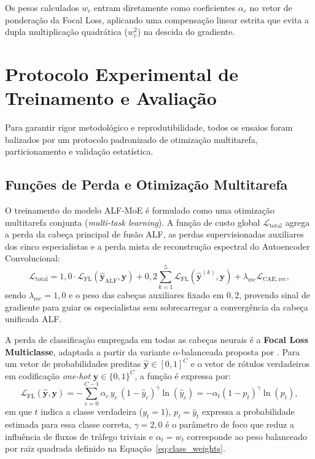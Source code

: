 Os pesos calculados $w_c$ entram diretamente como coeficientes $\alpha_c$ no vetor de ponderação da Focal Loss, aplicando uma compensação linear estrita que evita a dupla multiplicação quadrática ($w_c^2$) na descida do gradiente.


\section{Protocolo Experimental de Treinamento e Avaliação}
\label{sec:protocolo_experimental}

Para garantir rigor metodológico e reprodutibilidade, todos os ensaios foram balizados por um protocolo padronizado de otimização multitarefa, particionamento e validação estatística.

\subsection{Funções de Perda e Otimização Multitarefa}
\label{subsec:funcoes_perda}

O treinamento do modelo ALF-MoE é formulado como uma otimização multitarefa conjunta (\emph{multi-task learning}). A função de custo global $\mathcal{L}_{\mathrm{total}}$ agrega a perda da cabeça principal de fusão ALF, as perdas supervisionadas auxiliares dos cinco especialistas e a perda mista de reconstrução espectral do Autoencoder Convolucional:
\begin{equation}
\label{eq:perda_multitarefa}
\mathcal{L}_{\mathrm{total}} = 1{,}0 \cdot \mathcal{L}_{\mathrm{FL}}(\hat{\mathbf{y}}_{\mathrm{ALF}}, \mathbf{y}) + 0{,}2 \sum_{k=1}^5 \mathcal{L}_{\mathrm{FL}}(\hat{\mathbf{y}}^{(k)}, \mathbf{y}) + \lambda_{\mathrm{rec}} \mathcal{L}_{\mathrm{CAE,rec}},
\end{equation}
sendo $\lambda_{\mathrm{rec}} = 1{,}0$ e o peso das cabeças auxiliares fixado em $0{,}2$, provendo sinal de gradiente para guiar os especialistas sem sobrecarregar a convergência da cabeça unificada ALF.

A perda de classificação empregada em todas as cabeças neurais é a \textbf{Focal Loss Multiclasse}, adaptada a partir da variante $\alpha$-balanceada proposta por . Para um vetor de probabilidades preditas $\hat{\mathbf{y}} \in [0, 1]^C$ e o vetor de rótulos verdadeiros em codificação \emph{one-hot} $\mathbf{y} \in \{0, 1\}^C$, a função é expressa por:
\begin{equation}
\label{eq:focal_loss}
\mathcal{L}_{\mathrm{FL}}(\hat{\mathbf{y}}, \mathbf{y}) = -\sum_{c=0}^{C-1} \alpha_c \, y_c \, (1 - \hat{y}_c)^\gamma \ln(\hat{y}_c) = -\alpha_t (1 - p_t)^\gamma \ln(p_t),
\end{equation}
em que $t$ indica a classe verdadeira ($y_t = 1$), $p_t = \hat{y}_t$ expressa a probabilidade estimada para essa classe correta, $\gamma = 2{,}0$ é o parâmetro de foco que reduz a influência de fluxos de tráfego triviais e $\alpha_t = w_t$ corresponde ao peso balanceado por raiz quadrada definido na Equação~\ref{eq:class_weights}.

